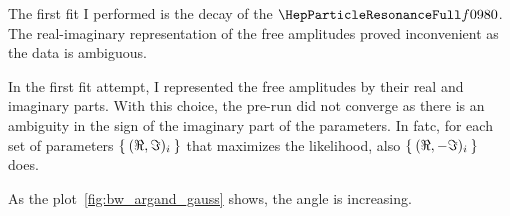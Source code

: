     The first fit I performed is the decay of the $\Pfnez$.
    The real-imaginary representation of the free amplitudes proved inconvenient as the data is ambiguous.

    In the first fit attempt, I represented the free amplitudes by their real and imaginary parts.
    With this choice, the pre-run did not converge as there is an ambiguity in the sign of the imaginary part of the parameters.
    In fatc, for each set of parameters $\Set{(\Re,\Im)_i}$ that maximizes the likelihood, also $\Set{(\Re,-\Im)_i}$ does.


    As the plot~\ref{fig:bw_argand_gauss} shows, the angle is increasing.





